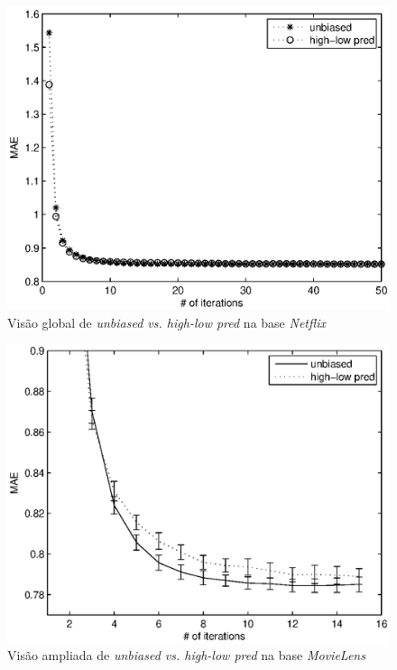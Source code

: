 \begin{figure}[ht]
\centering
\includegraphics{nf_global_highlow_unbiased.eps}
\caption{Visão global de \textit{unbiased vs. high-low pred} na base \textit{Netflix}}
\label{fig:unbiased-highlowpred-global-netflix}
\end{figure}

\begin{figure}[ht]
\centering
\includegraphics{ml_focus_highlow_unbiased.eps}
\caption{Visão ampliada de \textit{unbiased vs. high-low pred} na base \textit{MovieLens}}
\label{fig:unbiased-highlowpred-focus-movielens}
\end{figure}

